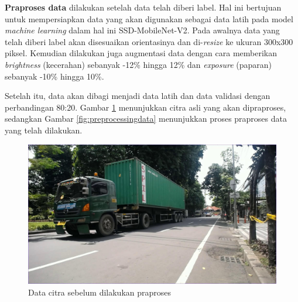 \textbf{Praproses data} dilakukan setelah data telah diberi label. Hal ini bertujuan untuk mempersiapkan data yang akan digunakan sebagai data latih pada model \emph{machine learning} dalam hal ini SSD-MobileNet-V2. Pada awalnya data yang telah diberi label akan disesuaikan orientasinya dan di-\emph{resize} ke ukuran 300x300 piksel. Kemudian dilakukan juga augmentasi data dengan cara memberikan \emph{brightness} (kecerahan) sebanyak -12\% hingga 12\% dan \emph{exposure} (paparan) sebanyak -10\% hingga 10\%.

Setelah itu, data akan dibagi menjadi data latih dan data validasi dengan perbandingan 80:20. Gambar \ref{fig:citraasli} menunjukkan citra asli yang akan dipraproses, sedangkan Gambar \ref{fig:preprocessingdata} menunjukkan proses praproses data yang telah dilakukan.

\begin{figure}[h]
  \centering

  \includegraphics[scale=0.2]{gambar/bab3-citra-asli.jpg}
  \caption{Data citra sebelum dilakukan praproses}
  \label{fig:citraasli}
  
\end{figure}


